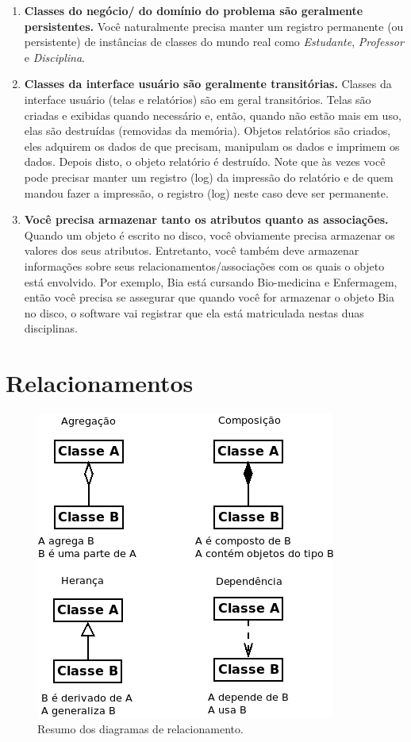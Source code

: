 \begin{enumerate}
\item \textbf{Classes do negócio/ do domínio do problema são geralmente persistentes.} Você  naturalmente precisa manter um registro permanente (ou persistente) de instâncias de classes do mundo real como \emph{Estudante}, \emph{Professor} e \emph{Disciplina}.

\item \textbf{Classes da interface usuário são geralmente transitórias.} Classes da interface usuário (telas e relatórios) são em geral transitórios. Telas são criadas e exibidas quando necessário e, então, quando não estão mais em uso, elas são destruídas (removidas da memória). Objetos relatórios são criados, eles adquirem os dados de que precisam, manipulam os dados e imprimem os dados. Depois disto, o objeto relatório é destruído. Note que às vezes você pode precisar manter um registro (log) da impressão do relatório e de quem mandou fazer a impressão, o registro (log) neste caso deve ser permanente.

\item \textbf{Você precisa armazenar tanto os atributos quanto as associações.}
Quando um objeto é escrito no disco, você obviamente precisa armazenar os valores dos seus atributos. Entretanto, você também deve armazenar informações sobre seus relacionamentos/associações com os quais o objeto está envolvido. Por exemplo, Bia está cursando Bio-medicina e Enfermagem, então você precisa se assegurar que quando você for armazenar o objeto Bia no disco, o software vai registrar que ela está matriculada nestas duas disciplinas.
\end{enumerate}

\section{Relacionamentos}

\begin{figure}[ht]
\begin{center}
\includegraphics[scale=0.65]{clsRelac.png}
\end{center}
\caption{Resumo dos diagramas de relacionamento.} \label{fig:relac}
\end{figure}

